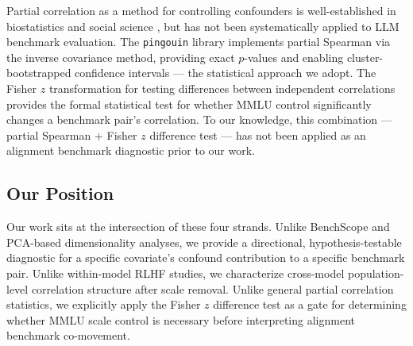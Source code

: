 Partial correlation as a method for controlling confounders is well-established in biostatistics and social science \citep{liu2017spearman}, but has not been systematically applied to LLM benchmark evaluation. The \texttt{pingouin} library \citep{vallat2018pingouin} implements partial Spearman via the inverse covariance method, providing exact $p$-values and enabling cluster-bootstrapped confidence intervals --- the statistical approach we adopt. The Fisher $z$ transformation for testing differences between independent correlations \citep{fisher1915} provides the formal statistical test for whether MMLU control significantly changes a benchmark pair's correlation. To our knowledge, this combination --- partial Spearman + Fisher $z$ difference test --- has not been applied as an alignment benchmark diagnostic prior to our work.

\subsection{Our Position}

Our work sits at the intersection of these four strands. Unlike BenchScope and PCA-based dimensionality analyses, we provide a directional, hypothesis-testable diagnostic for a specific covariate's confound contribution to a specific benchmark pair. Unlike within-model RLHF studies, we characterize cross-model population-level correlation structure after scale removal. Unlike general partial correlation statistics, we explicitly apply the Fisher $z$ difference test as a gate for determining whether MMLU scale control is necessary before interpreting alignment benchmark co-movement.

